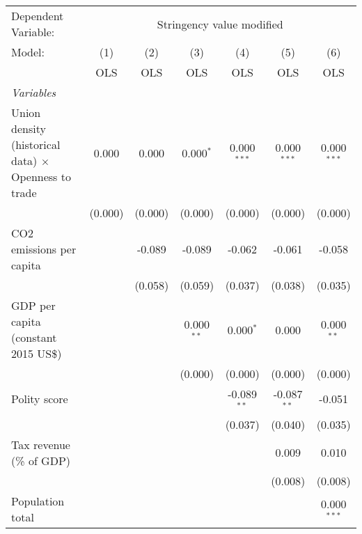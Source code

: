 
\begingroup
\centering
\begin{tabular}{lcccccc}
   \toprule
   Dependent Variable: & \multicolumn{6}{c}{Stringency value modified}\\
   Model:                                                      & (1)     & (2)     & (3)          & (4)           & (5)           & (6)\\  
                                                               &  OLS    & OLS     & OLS          & OLS           & OLS           & OLS\\  
   \midrule
   \emph{Variables}\\
   Union density (historical data) $\times$ Openness to trade  & 0.000   & 0.000   & 0.000$^{*}$  & 0.000$^{***}$ & 0.000$^{***}$ & 0.000$^{***}$\\   
                                                               & (0.000) & (0.000) & (0.000)      & (0.000)       & (0.000)       & (0.000)\\   
   CO2 emissions per capita                                    &         & -0.089  & -0.089       & -0.062        & -0.061        & -0.058\\   
                                                               &         & (0.058) & (0.059)      & (0.037)       & (0.038)       & (0.035)\\   
   GDP per capita (constant 2015 US\$)                         &         &         & 0.000$^{**}$ & 0.000$^{*}$   & 0.000         & 0.000$^{**}$\\   
                                                               &         &         & (0.000)      & (0.000)       & (0.000)       & (0.000)\\   
   Polity score                                                &         &         &              & -0.089$^{**}$ & -0.087$^{**}$ & -0.051\\   
                                                               &         &         &              & (0.037)       & (0.040)       & (0.035)\\   
   Tax revenue (\% of GDP)                                     &         &         &              &               & 0.009         & 0.010\\   
                                                               &         &         &              &               & (0.008)       & (0.008)\\   
   Population total                                            &         &         &              &               &               & 0.000$^{***}$\\   

\end{tabular}
